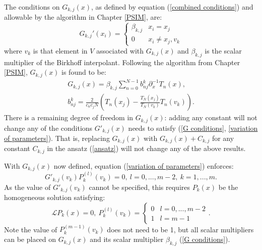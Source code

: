 \documentclass{book}
\begin{document}
The conditions on $G_{k,j}(x)$, as defined by equation (\ref{combined conditions}) and allowable by the algorithm in Chapter \ref{PSIM}, are:
\begin{equation} \label{G conditions}
G_{k,j}'(x_i) = \begin{cases} \beta_{k,j} & x_i = x_j \\ 0 & x_i \neq x_j, v_k \end{cases}
\end{equation}
where $v_k$ is that element in $V$ associated with $G_{k,j}(x)$
and $\beta_{k,j}$ is the scalar multiplier of the Birkhoff interpolant.
Following the algorithm from Chapter \ref{PSIM}, $G_{k,j}(x)$ is found to be:
\begin{equation} \label{eq:G functions}
\begin{gathered}
G_{k,j} (x) = \beta_{k,j} \sum_{n=0}^{N-1} b^k_{nj} \partial_x^{-1} T_n(x), \\
 b^k_{nj} = \frac{2}{c_n c_j N} \left ( T_n(x_j) - \frac{T_N(x_j)}{T_N(v_k)} T_n(v_k) \right ).
\end{gathered}
\end{equation}
There is a remaining degree of freedom in $G_{k,j}(x)$: 
adding any constant will not change any of the conditions $G'_{k,j}(x)$ needs to satisfy (\ref{G conditions}, \ref{variation of parameters}).
That is, replacing $G_{k,j}(x)$ with $G_{k,j}(x) + C_{k,j}$ for any constant $C_{k,j}$ in the ansatz (\ref{ansatz}) will not change any of the above results.

With $G_{k,j}(x)$ now defined, equation (\ref{variation of parameters}) enforces:
\begin{equation}
G'_{k,j}(v_k) P_k^{(l)}(v_k) = 0, \ l = 0,...,m-2, \ k = 1,...,m .
\end{equation}
As the value of $G'_{k,j}(v_k)$ cannot be specified, this requires $P_k(x)$ be the homogeneous solution satisfying: %
\begin{equation} \label{homog solns}
\mathcal{L}P_k(x) = 0, \ P_k^{(l)}(v_k) = \begin{cases} 0 & l = 0,...,m-2 \\ 1 & l = m-1 \end{cases} .
\end{equation}
Note the value of $P_k^{(m-1)}(v_k)$ does not need to be 1, but all scalar multipliers can be placed on $G_{k,j}(x)$ and its scalar multiplier $\beta_{k,j}$ (\ref{G conditions}).
\end{document}
